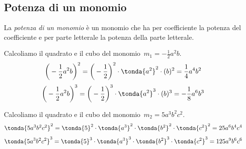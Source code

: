 \subsection{Potenza di un monomio}
\label{subsec:09_monomi_potenza}

% 
% 

\begin{definizione}
La \emph{potenza di un monomio} è un monomio
che ha per coefficiente la potenza del coefficiente e per parte
letterale la potenza della parte letterale.
\end{definizione}

 \begin{esempio}
Calcoliamo il quadrato e il cubo del monomio~\(m_{1}=-{\frac{1}{2}}a^{2}b\).
\begin{align*}
\bigg(-{\frac{1}{2}}a^{2}b\bigg)^{2}
&=\bigg(-{\frac{1}{2}}\bigg)^{2}\cdot\tonda{a^{2}}^{2}\cdot (b)^{2}
=\frac{1}{4}a^{4}b^{2}
\end{align*}
\begin{align*}
\bigg(-{\frac{1}{2}}a^{2}b\bigg)^{3}
&=\bigg(-{\frac{1}{2}}\bigg)^{3}\cdot\tonda{a^{2}}^{3}\cdot (b)^{3}
=-{\frac{1}{8}}a^{6}b^{3}
\end{align*}
 \end{esempio}

 \begin{esempio}
Calcoliamo il quadrato e il cubo del monomio~\(m_{2}=5a^{3}b^{2}c^{2}\).
\begin{align*}
\tonda{5a^{3}b^{2}c^{2}}^{2}
&=\tonda{5}^{2}\cdot \tonda{a^{3}}^{2}\cdot\tonda{b^{2}}^{2}\cdot 
\tonda{c^{2}}^{2}
=25a^{6}b^{4}c^{4}
\end{align*}
\begin{align*}
\tonda{5a^{3}b^{2}c^{2}}^{3}
&=\tonda{5}^{3}\cdot \tonda{a^{3}}^{3}\cdot\tonda{b^{2}}^{3}\cdot 
\tonda{c^{2}}^{3}
=125a^{9}b^{6}c^{6}
\end{align*}
 \end{esempio}

